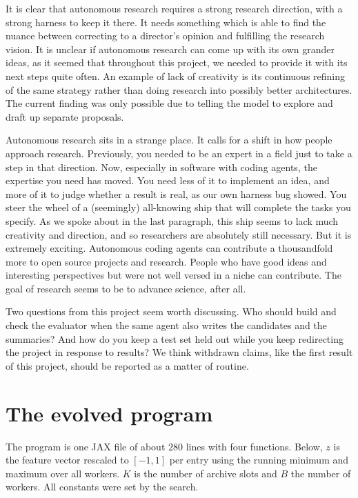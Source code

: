 \documentclass{article}
\begin{document}
It is clear that autonomous research requires a strong research direction, with a strong harness to keep it there. It needs
something which is able to find the nuance between correcting to a director's opinion and fulfilling the research vision. It
is unclear if autonomous research can come up with its own grander ideas, as it seemed that throughout this project, we
needed to provide it with its next steps quite often. An example of lack of creativity is its continuous refining of the
same strategy rather than doing research into possibly better architectures. The current finding was only possible due to
telling the model to explore and draft up separate proposals.

Autonomous research sits in a strange place. It calls for a shift in how people approach research. Previously, you needed to
be an expert in a field just to take a step in that direction. Now, especially in software with coding agents, the
expertise you need has moved. You need less of it to implement an idea, and more of it to judge whether a result is real,
as our own harness bug showed. You steer the wheel of a (seemingly) all-knowing ship that will complete the tasks
you specify. As we spoke about in the last paragraph, this ship seems to lack much creativity and direction, and so
researchers are absolutely still necessary. But it is extremely exciting. Autonomous coding agents can contribute a
thousandfold more to open source projects and research. People who have good ideas and interesting perspectives but were
not well versed in a niche can contribute. The goal of research seems to be to advance science, after all.

Two questions from this project seem worth discussing. Who should build and check the evaluator when the same agent also
writes the candidates and the summaries? And how do you keep a test set held out while you keep redirecting the project in
response to results? We think withdrawn claims, like the first result of this project, should be reported as a matter of
routine.

\clearpage



\appendix

\section{The evolved program}
\label{app:program}
The program is one JAX file of about $280$ lines with four functions. Below, $z$ is the feature vector rescaled to
$[-1,1]$ per entry using the running minimum and maximum over all workers. $K$ is the number of archive slots and $B$ the
number of workers. All constants were set by the search.
\end{document}
